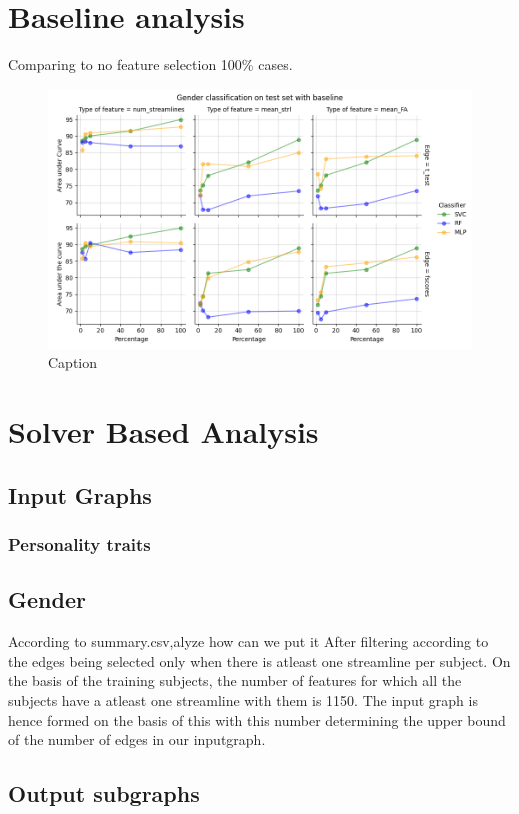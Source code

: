 \documentclass[msthesis.tex]{subfiles}
\begin{document}
\section{Baseline analysis}
Comparing to no feature selection 100\% cases.
\begin{figure}
    \centering
    \includegraphics[width=\textwidth]{images/baseline_results_gender.png}
    \caption{Caption}
    \label{fig:my_label}
\end{figure}
\section{Solver Based Analysis}
\subsection{Input Graphs}
\subsubsection{Personality traits}

\subsection{Gender}
According to summary.csv,alyze how can we put it
After filtering according to the edges being selected only when there is atleast one streamline per subject. On the basis of the training subjects, the number of features for which all the subjects have a atleast one streamline with them is 1150. The input graph is hence formed on the basis of this with this number determining the upper bound of the number of edges in our inputgraph. 

\subsection{Output subgraphs}
\end{document}
